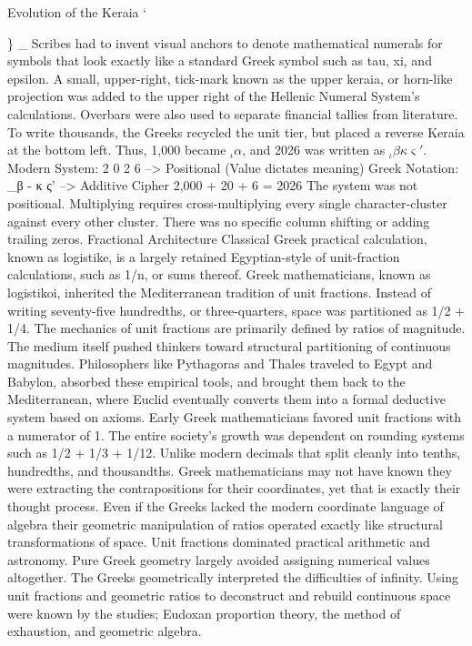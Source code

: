 Evolution of the Keraia {‘}{\} {_}
Scribes had to invent visual anchors to denote mathematical numerals for symbols that look exactly like a standard Greek symbol such as tau, xi, and epsilon. A small, upper-right, tick-mark known as the upper keraia, or horn-like projection was added to the upper right of the Hellenic Numeral System’s calculations. Overbars were also used to separate financial tallies from literature. To write thousands, the Greeks recycled the unit tier, but placed a reverse Keraia at the bottom left. 
Thus, 1,000 became \(_\iota\alpha\), and 2026 was written as \(_\iota\beta\kappa\varsigma'\).
Modern System:   2   0   2   6 --> Positional (Value dictates meaning)
Greek Notation: _β   -   κ   ς' --> Additive Cipher 2,000  +  20  + 6  = 2026
The system was not positional. Multiplying requires cross-multiplying every single character-cluster against every other cluster. There was no specific column shifting or adding trailing zeros. 
Fractional Architecture
Classical Greek practical calculation, known as logistike, is a largely retained Egyptian-style of unit-fraction calculations, such as 1/n, or sums thereof. Greek mathematicians, known as logistikoi, inherited the Mediterranean tradition of unit fractions. Instead of writing seventy-five hundredths, or three-quarters, space was partitioned as 1/2 + 1/4. The mechanics of unit fractions are primarily defined by ratios of magnitude. The medium itself pushed thinkers toward structural partitioning of continuous magnitudes. Philosophers like Pythagoras and Thales traveled to Egypt and Babylon, absorbed these empirical tools, and brought them back to the Mediterranean, where Euclid eventually converts them into a formal deductive system based on axioms.
Early Greek mathematicians favored unit fractions with a numerator of 1. The entire society’s growth was dependent on rounding systems such as 1/2 + 1/3 + 1/12. Unlike modern decimals that split cleanly into tenths, hundredths, and thousandths. Greek mathematicians may not have known they were extracting the contrapositions for their coordinates, yet that is exactly their thought process. Even if the Greeks lacked the modern coordinate language of algebra their geometric manipulation of ratios operated exactly like structural transformations of space. Unit fractions dominated practical arithmetic and astronomy. Pure Greek geometry largely avoided assigning numerical values altogether. The Greeks geometrically interpreted the difficulties of infinity. Using unit fractions and geometric ratios to deconstruct and rebuild continuous space were known by the studies; Eudoxan proportion theory, the method of exhaustion, and geometric algebra.

}
